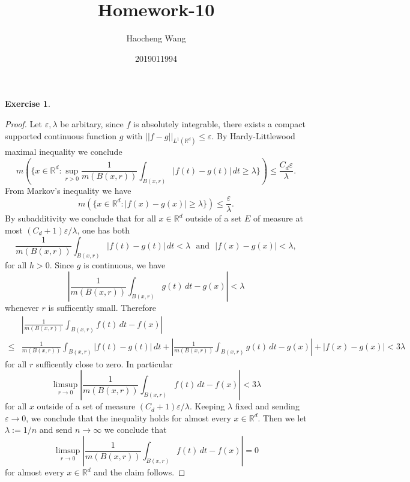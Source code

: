 \documentclass[a4paper]{article}
\title{Homework-10}
\author{Haocheng Wang \and 2019011994}
\newtheorem{ex}{Exercise}[subsection]
\begin{document}
\maketitle
\setcounter{ex}{16}\begin{ex}\end{ex}\begin{proof}
Let $\varepsilon, \lambda$ be arbitary, since $f$ is absolutely integrable, there exists a compact supported continuous 
function $g$ with $||f - g||_{L^1(\mathbb{R}^d)} \leq \varepsilon$. By Hardy-Littlewood maximal inequality we conclude$$
m(\{x \in \mathbb{R}^d : \sup_{r > 0}\frac{1}{m(B(x, r))} \int_{B(x, r)} |f(t) - g(t)|\,dt \geq \lambda\}) 
\leq \frac{C_d\varepsilon}{\lambda}.
$$From Markov's inequality we have $$
m(\{x \in \mathbb{R}^d : |f(x) - g(x)| \geq \lambda\}) \leq \frac{\varepsilon}{\lambda}.
$$By subadditivity we conclude that for all $x \in \mathbb{R}^d$ outside of a set $E$ of measure at most $(C_d + 1)\varepsilon / \lambda$,
one has both $$
\frac{1}{m(B(x, r))} \int_{B(x, r)} |f(t) - g(t)|\,dt < \lambda\ \ \ \text{and}\ \ \ 
|f(x) - g(x)| < \lambda,
$$for all $h > 0$. Since $g$ is continuous, we have $$
|\frac{1}{m(B(x, r))}\int_{B(x, r)}g(t)\,dt  - g(x)| < \lambda
$$whenever $r$ is sufficently small. Therefore\begin{align*}
&|\frac{1}{m(B(x, r))}\int_{B(x, r)}f(t)\,dt  - f(x)|\\ \leq{} &\frac{1}{m(B(x, r))}\int_{B(x, r)}|f(t) - g(t)|\,dt + 
|\frac{1}{m(B(x, r))}\int_{B(x, r)}g(t)\,dt  - g(x)| + |f(x) - g(x)| < 3\lambda
\end{align*}for all $r$ sufficently close to zero. In particular$$
\limsup_{r \to 0} |\frac{1}{m(B(x, r))}\int_{B(x, r)}f(t)\,dt - f(x)| < 3\lambda
$$for all $x$ outside of a set of measure $(C_d + 1)\varepsilon/\lambda$. Keeping $\lambda$ fixed and sending $\varepsilon \to 0$,
we conclude that the inequality holds for almost every $x \in \mathbb{R}^d$. Then we let $\lambda := 1/n$ and send
$n \to \infty$ we conclude that $$
\limsup_{r \to 0} |\frac{1}{m(B(x, r))}\int_{B(x, r)}f(t)\,dt - f(x)| = 0
$$for almost every $x \in \mathbb{R}^d$ and the claim follows.
\end{proof}
\end{document}
